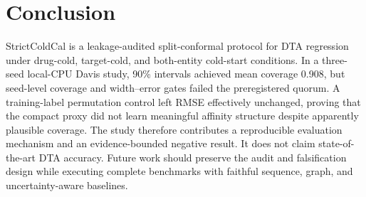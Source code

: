 \documentclass[lettersize,journal]{IEEEtran}
\begin{document}
\section{Conclusion}
StrictColdCal is a leakage-audited split-conformal protocol for DTA regression under drug-cold, target-cold, and both-entity cold-start conditions. In a three-seed local-CPU Davis study, 90\% intervals achieved mean coverage 0.908, but seed-level coverage and width--error gates failed the preregistered quorum. A training-label permutation control left RMSE effectively unchanged, proving that the compact proxy did not learn meaningful affinity structure despite apparently plausible coverage. The study therefore contributes a reproducible evaluation mechanism and an evidence-bounded negative result. It does not claim state-of-the-art DTA accuracy. Future work should preserve the audit and falsification design while executing complete benchmarks with faithful sequence, graph, and uncertainty-aware baselines.



\end{document}
